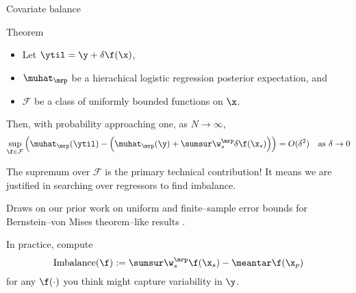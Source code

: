 
\begin{frame}[t]{Covariate balance}

\begin{block}{Theorem}
    \begin{itemize}
        \item Let $\ytil = \y + \delta \f(\x)$,
        \item $\muhat_{\mrp}$ be a hierachical logistic regression posterior expectation, and
        \item $\mathcal{F}$ be a class of uniformly bounded functions on $\x$.
    \end{itemize}
    Then, with probability approaching one, as $N \rightarrow \infty$,
    $$
    \begin{aligned}
        \sup_{\f \in \mathcal{F}} \left(
            \muhat_\mrp(\ytil) -
            \left(\muhat_\mrp(\y) + \sumsur \w_s^{\mrp} \delta \f(\x_s) \right)
            \right)
        = O(\delta^2)
        \quad\textrm{as }\delta \rightarrow 0
    \end{aligned}
    $$
\end{block}

The supremum over $\mathcal{F}$ is the primary technical contribution!
It means we are justified in searching over regressors
to find imbalance.

Draws on our prior work on uniform and finite--sample error bounds for Bernstein--von Mises
theorem--like results \citep{giordano:2024:bayesij,kasprzak:2025:laplace}.

In practice, compute
$$
\textrm{Imbalance}(\f) := \sumsur \w_s^{\mrp} \f(\x_s)  - \meantar \f(\x_p)
$$
for any $\f(\cdot)$ you think might capture variability in $\y$.

\end{frame}





